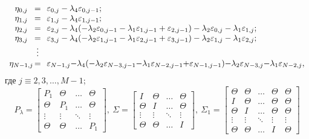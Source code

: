 \[ \begin{array}{ccl}
\eta_{0,j} &\hspace{-3mm} =\hspace{-1mm} & \varepsilon_{0,j} - \lambda_4\varepsilon_{0,j-1};\\
\eta_{1,j} & \hspace{-3mm}=\hspace{-1mm} & \varepsilon_{1,j} - \lambda_4\varepsilon_{1,j-1};\\
\eta_{2,j} & \hspace{-3mm}=\hspace{-1mm} & \varepsilon_{2,j} - \lambda_4(-\lambda_2\varepsilon_{0,j-1} -\lambda_1\varepsilon_{1,j-1} +\varepsilon_{2,j-1}) -\lambda_2\varepsilon_{0,j} - \lambda_1\varepsilon_{1,j};\\
\eta_{3,j} & \hspace{-3mm}=\hspace{-1mm} & \varepsilon_{3,j} - \lambda_4(-\lambda_2\varepsilon_{1,j-1} -\lambda_1\varepsilon_{2,j-1}  +\varepsilon_{3,j-1}) - \lambda_2\varepsilon_{1,j}  -\lambda_1\varepsilon_{2,j};\\
& \hspace{-3mm}\vdots \hspace{-1mm}\\
\eta_{N-1,j} & \hspace{-3mm}=\hspace{-1mm} & \varepsilon_{N-1,j} {-}\lambda_4(-\lambda_2\varepsilon_{N-3,j-1}  {-}\lambda_1\varepsilon_{N-2,j-1}  {+}\varepsilon_{N-1,j-1}) {-}\lambda_2\varepsilon_{N-3,j}  {-}\lambda_1\varepsilon_{N-2,j},
\end{array} \]
где $j\equiv 2, 3,\ldots, M-1$;
\[
P_\lambda= \begin{bmatrix}
P_1 & \Theta &  \ldots & \Theta \\
\Theta & P_1 & \ldots & \Theta \\
\vdots & \vdots &  \ddots & \vdots\\
\Theta & \Theta &  \ldots & P_1
\end{bmatrix}, \
\Sigma= \begin{bmatrix}
I & \Theta &  \ldots & \Theta \\
\Theta & I &  \ldots & \Theta \\
\vdots & \vdots& \ddots & \vdots\\
\Theta & \Theta& \ldots & I
\end{bmatrix},
\
\Sigma_1= \begin{bmatrix}
\Theta & \Theta & \ldots & \Theta &  \Theta \\
I & \Theta & \ldots &\Theta &  \Theta \\
\Theta & I &\ldots &  \Theta & \Theta \\
\vdots & \vdots & \ddots & \vdots & \vdots\\
\Theta & \Theta &\ldots &  I & \Theta
\end{bmatrix} 
\]
